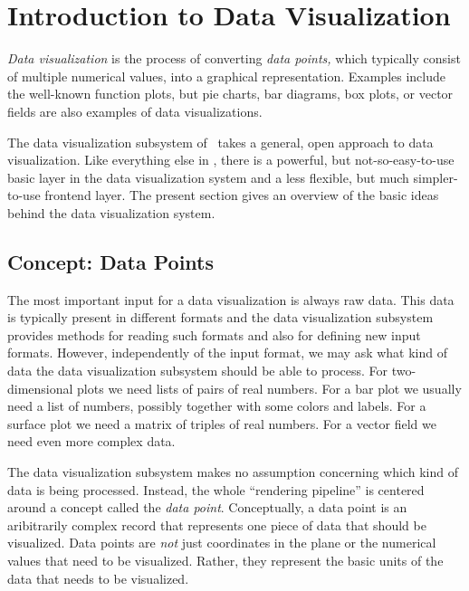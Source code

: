 %
%
%


\section{Introduction to Data Visualization}

\emph{Data visualization} is the process of converting \emph{data
  points,} which typically consist of multiple numerical values, into
a graphical representation. Examples include the well-known function
plots, but pie charts, bar diagrams, box plots, or vector fields are
also examples of data visualizations.

The data visualization subsystem of \pgfname\ takes a general, open
approach to data visualization. Like everything else in \pgfname,
there is a powerful, but not-so-easy-to-use basic layer in the data
visualization system and a less flexible, but much simpler-to-use
frontend layer. The present section gives an overview of the
basic ideas behind the data visualization system.


\subsection{Concept: Data Points}

\label{section-dv-intro-data-points}

The most important input for a data visualization is always raw
data. This data is typically present in different formats and the data
visualization subsystem provides methods for reading such formats and
also for defining new input formats. However, independently of the
input format, we may ask what kind of data the data visualization
subsystem should be able to process. For two-dimensional plots we
need lists of pairs of real numbers. For a bar plot we usually need a
list of numbers, possibly together with some colors and labels. For a
surface plot we need a matrix of triples of real numbers. For a vector
field we need even more complex data.

The data visualization subsystem makes no assumption concerning which
kind of data is being processed. Instead, the whole
``rendering pipeline'' is centered around a concept called the
\emph{data point}. Conceptually, a data point is an aribitrarily
complex record that represents one piece of data that should be
visualized. Data points are \emph{not} just coordinates in the plane
or the numerical values that need to be visualized. Rather, they
represent the basic units of the data that needs to be visualized.

